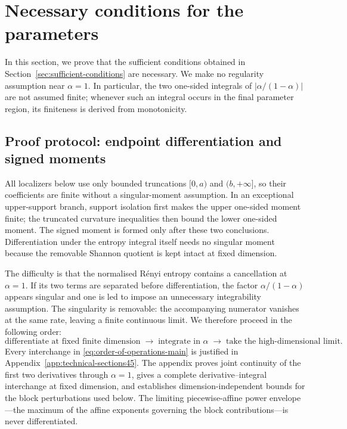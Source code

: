 \documentclass[aps,pra,11pt,onecolumn,nofootinbib,tightenlines]{revtex4-2}
\theoremstyle{definition}
\begin{document}
\section{Necessary conditions for the parameters}
\label{sec:necessary-conditions}

In this section, we prove that the sufficient conditions obtained in Section~\ref{sec:sufficient-conditions} are necessary. We make no regularity assumption near $\alpha=1$. In particular, the two one-sided integrals of $|\alpha/(1-\alpha)|$ are not assumed finite; whenever such an integral occurs in the final parameter region, its finiteness is derived from monotonicity.

\subsection{Proof protocol: endpoint differentiation and signed moments}
\label{sec:necessity-protocol}

All localizers below use only bounded truncations $[0,a)$ and $(b,+\infty]$, so their coefficients are finite without a singular-moment assumption. In an exceptional upper-support branch, support isolation first makes the upper one-sided moment finite; the truncated curvature inequalities then bound the lower one-sided moment. The signed moment is formed only after these two conclusions. Differentiation under the entropy integral itself needs no singular moment because the removable Shannon quotient is kept intact at fixed dimension.

The difficulty is that the normalised R\'enyi entropy contains a cancellation at $\alpha=1$. If its two terms are separated before differentiation, the factor $\alpha/(1-\alpha)$ appears singular and one is led to impose an unnecessary integrability assumption.  The singularity is removable: the accompanying numerator vanishes at the same rate, leaving a finite continuous limit. We therefore proceed in the following order:
\begin{equation}
 \boxed{
 \text{differentiate at fixed finite dimension}
 \;\longrightarrow\;
 \text{integrate in }\alpha
 \;\longrightarrow\;
 \text{take the high-dimensional limit}.}
 \label{eq:order-of-operations-main}
\end{equation}
Every interchange in \eqref{eq:order-of-operations-main} is justified in Appendix~\ref{app:technical-sections45}. The appendix proves joint continuity of the first two derivatives through $\alpha=1$, gives a complete derivative--integral interchange at fixed dimension, and establishes dimension-independent bounds for the block perturbations used below. The limiting piecewise-affine power envelope---the maximum of the affine exponents governing the block contributions---is never differentiated.
\end{document}
